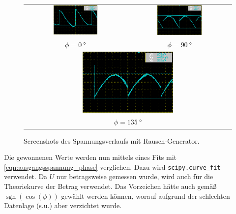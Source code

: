 \begin{figure}
  \centering
\begin{tabular}{cc}
  \includegraphics[width=0.45\textwidth]{content/img/screenshots/MAP013.png} &  \includegraphics[width=0.45\textwidth]{content/img/screenshots/MAP014.png} \\
  $\phi = \SI{0}{\degree}$ &
  $\phi = \SI{90}{\degree}$ \\
\multicolumn{2}{c}{\includegraphics[width=0.45\textwidth]{content/img/screenshots/MAP015.png}} \\
\multicolumn{2}{c}{$\phi = \SI{135}{\degree}$}
\end{tabular}
\caption{Screenshots des Spannungsverlaufs mit Rausch-Generator.}
\label{fig:screenshots_2}
\end{figure}

\FloatBarrier

Die gewonnenen Werte werden nun mittels eines Fits
mit \autoref{eqn:ausgangsspannung_phase} verglichen.
Dazu wird \texttt{scipy.curve\_fit} verwendet.
Da $U$ nur betragsweise gemessen wurde,
wird auch für die Theoriekurve der Betrag verwendet.
Das Vorzeichen hätte auch gemäß $\operatorname{sgn}({\cos{(\phi)}})$ gewählt werden können,
worauf aufgrund der schlechten Datenlage (s.u.) aber verzichtet wurde.


